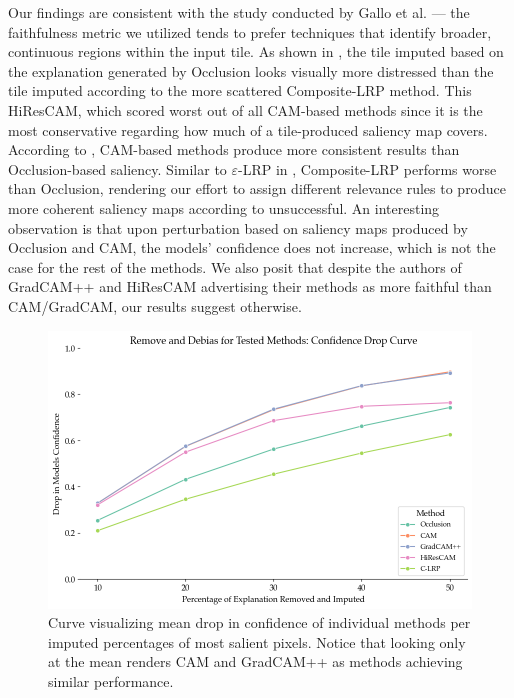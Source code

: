 Our findings are consistent with the study conducted by Gallo et al. \cite{gallo} --- the faithfulness metric we utilized tends to prefer techniques that identify broader, continuous regions within the input tile.
As shown in , the tile imputed based on the explanation generated by Occlusion looks visually more distressed than the tile imputed according to the more scattered Composite-LRP method.
This  HiResCAM, which scored worst out of all CAM-based methods since it is the most conservative regarding how much of a tile-produced saliency map covers.
According to , CAM-based methods produce more consistent results than Occlusion-based saliency.
Similar to $\varepsilon$-LRP in \cite{gallo}, Composite-LRP performs worse than Occlusion, rendering our effort to assign different relevance rules to produce more coherent saliency maps according to \cite{lrp} unsuccessful.
An interesting observation is that upon perturbation based on saliency maps produced by Occlusion and CAM, the models' confidence does not increase, which is not the case for the rest of the methods.
We also posit that despite the authors of GradCAM++ and HiResCAM \cite{grad-cam, hires-cam} advertising their methods as more faithful than CAM/GradCAM, our results suggest otherwise.

\begin{figure}
    \begin{center}
    \begin{minipage}{0.7\textwidth}
      \includegraphics[width=\textwidth]{img/road-curve.png}
    \end{minipage}
    \caption{Curve visualizing mean drop in confidence of individual methods per imputed percentages of most salient pixels. Notice that looking only at the mean renders CAM and GradCAM++ as methods achieving similar performance.}
    \label{fig:road-curve}
    \end{center}
\end{figure}

